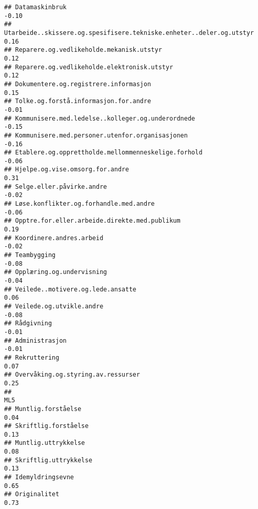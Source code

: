 \documentclass[
]{article}
\begin{document}
\begin{verbatim}
## Datamaskinbruk                                                                   -0.10
## Utarbeide..skissere.og.spesifisere.tekniske.enheter..deler.og.utstyr              0.16
## Reparere.og.vedlikeholde.mekanisk.utstyr                                          0.12
## Reparere.og.vedlikeholde.elektronisk.utstyr                                       0.12
## Dokumentere.og.registrere.informasjon                                             0.15
## Tolke.og.forstå.informasjon.for.andre                                            -0.01
## Kommunisere.med.ledelse..kolleger.og.underordnede                                -0.15
## Kommunisere.med.personer.utenfor.organisasjonen                                  -0.16
## Etablere.og.opprettholde.mellommenneskelige.forhold                              -0.06
## Hjelpe.og.vise.omsorg.for.andre                                                   0.31
## Selge.eller.påvirke.andre                                                        -0.02
## Løse.konflikter.og.forhandle.med.andre                                           -0.06
## Opptre.for.eller.arbeide.direkte.med.publikum                                     0.19
## Koordinere.andres.arbeid                                                         -0.02
## Teambygging                                                                      -0.08
## Opplæring.og.undervisning                                                        -0.04
## Veilede..motivere.og.lede.ansatte                                                 0.06
## Veilede.og.utvikle.andre                                                         -0.08
## Rådgivning                                                                       -0.01
## Administrasjon                                                                   -0.01
## Rekruttering                                                                      0.07
## Overvåking.og.styring.av.ressurser                                                0.25
##                                                                                    ML5
## Muntlig.forståelse                                                                0.04
## Skriftlig.forståelse                                                              0.13
## Muntlig.uttrykkelse                                                               0.08
## Skriftlig.uttrykkelse                                                             0.13
## Idemyldringsevne                                                                  0.65
## Originalitet                                                                      0.73

\end{verbatim}
\end{document}
